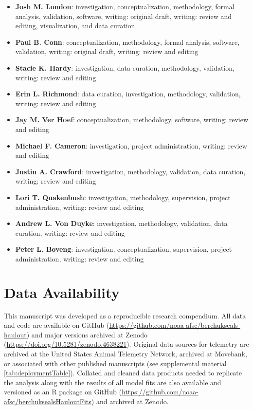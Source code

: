 \documentclass[fleqn,10pt,lineno]{wlpeerj} %
\providecommand{\tightlist}{%
  \setlength{\itemsep}{0pt}\setlength{\parskip}{0pt}}
\begin{document}
\begin{itemize}
\tightlist
\item
  \textbf{Josh M. London}: investigation, conceptualization, methodology,
  formal analysis, validation, software, writing: original draft, writing:
  review and editing, visualization, and data curation
\item
  \textbf{Paul B. Conn}: conceptualization, methodology, formal analysis,
  software, validation, writing: original draft, writing: review and
  editing
\item
  \textbf{Stacie K. Hardy}: investigation, data curation, methodology,
  validation, writing: review and editing
\item
  \textbf{Erin L. Richmond}: data curation, investigation, methodology,
  validation, writing: review and editing
\item
  \textbf{Jay M. Ver Hoef}: conceptualization, methodology, software, writing:
  review and editing
\item
  \textbf{Michael F. Cameron}: investigation, project administration, writing:
  review and editing
\item
  \textbf{Justin A. Crawford}: investigation, methodology, validation, data curation,
  writing: review and editing
\item
  \textbf{Lori T. Quakenbush}: investigation, methodology, supervision, project
  administration, writing: review and editing
\item
  \textbf{Andrew L. Von Duyke}: investigation, methodology, validation, data curation,
  writing: review and editing
\item
  \textbf{Peter L. Boveng}: investigation, conceptualization, supervision,
  project administration, writing: review and editing
\end{itemize}

\hypertarget{data-availability}{%
\section*{Data Availability}\label{data-availability}}

This manuscript was developed as a reproducible research compendium. All data and
code are available on GitHub (\url{https://github.com/noaa-afsc/berchukseals-haulout}) and
major versions archived at Zenodo (\url{https://doi.org/10.5281/zenodo.4638221}).
Original data sources for telemetry are archived
at the United States Animal Telemetry Network, archived at Movebank, or
associated with other published manuscripts (see supplemental
material \ref{tab:deploymentTable}). Collated and cleaned data products
needed to replicate the analysis along with the results of all model fits are
also available and versioned as an R package on
GitHub (\url{https://github.com/noaa-afsc/berchuksealsHauloutFits}) and archived at
Zenodo.
\end{document}
